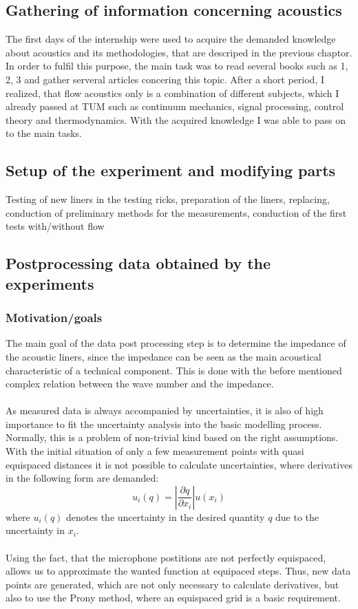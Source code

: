 \documentclass{article}
\begin{document}
\subsection{Gathering of information concerning acoustics } 
The first days of the internship were used to acquire the demanded knowledge about acoustics and its methodologies, that are descriped in the previous chaptor. In order to fulfil this purpose, the main task was to read several books such as 1, 2, 3 and gather serveral articles concering this topic. After a short period, I realized, that flow acoustics only is a combination of different subjects, which I already passed at TUM such as continuum mechanics, signal processing, control theory and thermodynamics. With the acquired knowledge I was able to pass on to the main tasks. 
\subsection{Setup of the experiment and modifying parts}
Testing of new liners in the testing ricks, preparation of the liners, replacing, conduction of preliminary methods for the measurements, conduction of the first tests with/without flow

\subsection{Postprocessing data obtained by the experiments}

\subsubsection{Motivation/goals}
The main goal of the data post processing step is to determine the impedance of the acoustic liners, since the impedance can be seen as the main acoustical characteristic of a technical component. This is done with the before mentioned complex relation between the wave number and the impedance. \\\\
As measured data is always accompanied by uncertainties, it is also of high importance to fit the uncertainty analysis into the basic modelling process. Normally, this is a problem of non-trivial kind based on the right assumptions. With the initial situation of only a few measurement points with quasi equispaced distances it is not possible to calculate uncertainties, where derivatives in the following form are demanded:
\begin{equation}
u_{i}(q)= \left\vert \frac{\partial q}{\partial x_{i}} \right\vert u( x_{i})
\end{equation}
where $u_{i}(q)$ denotes the uncertainty in the desired quantity $q$ due to the uncertainty in $x_{i}$.
\\
\\
Using the fact, that the microphone postitions are not perfectly equispaced, allows us to approximate the wanted function at equipaced steps. Thus, new data points are generated, which are not only necessary to calculate derivatives, but also to use the Prony method, where an equispaced grid is a basic requirement. 
\end{document}
